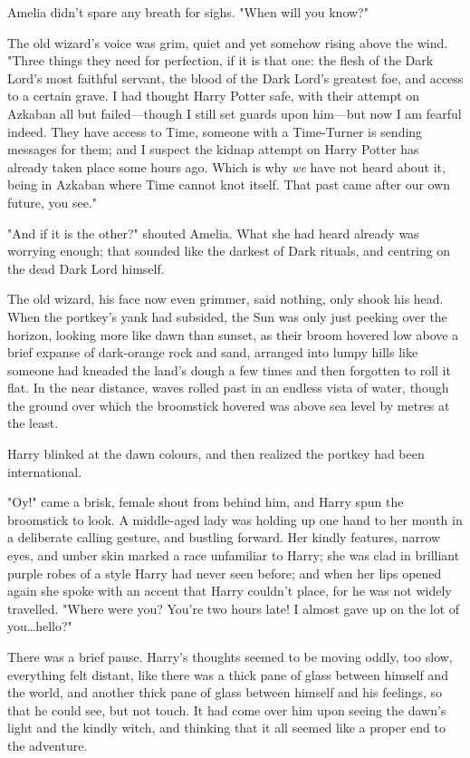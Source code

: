 Amelia didn’t spare any breath for sighs. "When will you know?"

The old wizard’s voice was grim, quiet and yet somehow rising above the wind.
"Three things they need for perfection, if it is that one: the flesh of the
Dark Lord’s most faithful servant, the blood of the Dark Lord’s greatest foe,
and access to a certain grave. I had thought Harry Potter safe, with their
attempt on Azkaban all but failed—though I still set guards upon him—but
now I am fearful indeed. They have access to Time, someone with a Time-Turner
is sending messages for them; and I suspect the kidnap attempt on Harry Potter
has already taken place some hours ago. Which is why \emph{we} have not heard
about it, being in Azkaban where Time cannot knot itself. That past came after
our own future, you see."

"And if it is the other?" shouted Amelia. What she had heard already was
worrying enough; that sounded like the darkest of Dark rituals, and centring
on the dead Dark Lord himself.

The old wizard, his face now even grimmer, said nothing, only shook his head.
\later
When the portkey’s yank had subsided, the Sun was only just peeking over the
horizon, looking more like dawn than sunset, as their broom hovered low above a
brief expanse of dark-orange rock and sand, arranged into lumpy hills like
someone had kneaded the land’s dough a few times and then forgotten to roll it
flat. In the near distance, waves rolled past in an endless vista of water,
though the ground over which the broomstick hovered was above sea level by
metres at the least.

Harry blinked at the dawn colours, and then realized the portkey had been
international.

"Oy!" came a brisk, female shout from behind him, and Harry spun the broomstick
to look. A middle-aged lady was holding up one hand to her mouth in a
deliberate calling gesture, and bustling forward. Her kindly features, narrow
eyes, and umber skin marked a race unfamiliar to Harry; she was clad in
brilliant purple robes of a style Harry had never seen before; and when her
lips opened again she spoke with an accent that Harry couldn’t place, for he
was not widely travelled. "Where were you? You’re two hours late! I almost gave
up on the lot of you…hello?"

There was a brief pause. Harry’s thoughts seemed to be moving oddly, too slow,
everything felt distant, like there was a thick pane of glass between himself
and the world, and another thick pane of glass between himself and his
feelings, so that he could see, but not touch. It had come over him upon seeing
the dawn’s light and the kindly witch, and thinking that it all seemed like a
proper end to the adventure.

